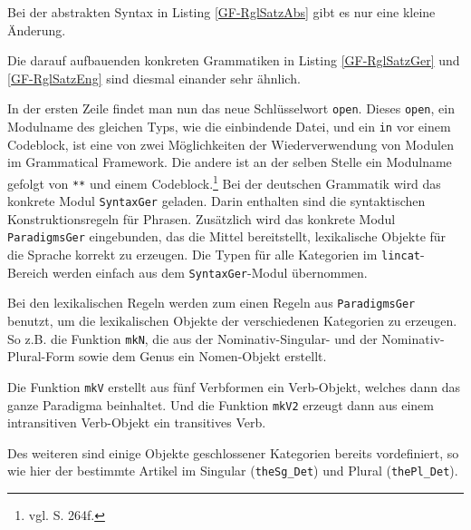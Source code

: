 
Bei der abstrakten Syntax in Listing \ref{GF-RglSatzAbs} gibt es nur eine kleine Änderung.

Die darauf aufbauenden konkreten Grammatiken in Listing \ref{GF-RglSatzGer} und \ref{GF-RglSatzEng} sind diesmal einander sehr ähnlich. \par
In der ersten Zeile findet man nun das neue Schlüsselwort \texttt{open}. Dieses \texttt{open}, ein Modulname des gleichen Typs, wie die einbindende Datei, und ein \texttt{in} vor einem Codeblock, ist eine von zwei Möglichkeiten der Wiederverwendung von Modulen im Grammatical Framework. Die andere ist an der selben Stelle ein Modulname gefolgt von \texttt{**} und einem Codeblock.\footnote{vgl. \cite{RANTA2011} S. 264f.} Bei der deutschen Grammatik wird das konkrete Modul \texttt{SyntaxGer} geladen. Darin enthalten sind die syntaktischen Konstruktionsregeln für Phrasen. Zusätzlich wird das konkrete Modul \texttt{ParadigmsGer} eingebunden, das die Mittel bereitstellt, lexikalische Objekte für die Sprache korrekt zu erzeugen. Die Typen für alle Kategorien im \texttt{lincat}-Bereich werden einfach aus dem \texttt{SyntaxGer}-Modul übernommen. \par
Bei den lexikalischen Regeln werden zum einen Regeln aus \texttt{ParadigmsGer} benutzt, um die lexikalischen Objekte der verschiedenen Kategorien zu erzeugen. So z.B. die Funktion \texttt{mkN}, die aus der Nominativ-Singular- und der Nominativ-Plural-Form sowie dem Genus ein Nomen-Objekt erstellt. \par
Die Funktion \texttt{mkV} erstellt aus fünf Verbformen ein Verb-Objekt, welches dann das ganze Paradigma beinhaltet. Und die Funktion \texttt{mkV2} erzeugt dann aus einem intransitiven Verb-Objekt ein transitives Verb. \par
Des weiteren sind einige Objekte geschlossener Kategorien bereits vordefiniert, so wie hier der bestimmte Artikel im Singular (\texttt{theSg\_Det}) und Plural (\texttt{thePl\_Det}). \par
